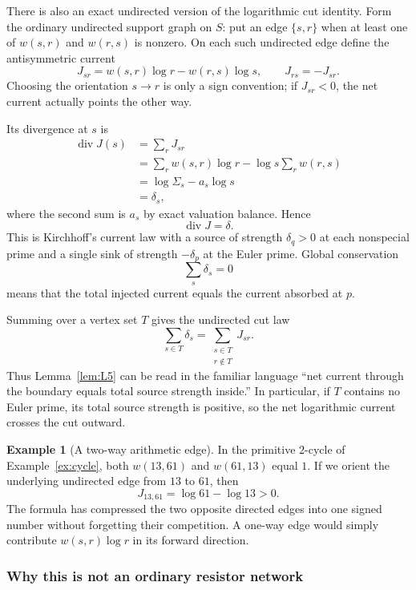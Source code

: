 \documentclass[11pt]{article}
\theoremstyle{definition}
\newtheorem{example}[theorem]{Example}
\theoremstyle{remark}
\begin{document}
There is also an exact undirected version of the logarithmic cut identity.
Form the ordinary undirected support graph on $S$: put an edge $\{s,r\}$ when
at least one of $w(s,r)$ and $w(r,s)$ is nonzero.  On each such undirected
edge define the antisymmetric current
\[
\boxed{
J_{sr}=w(s,r)\log r-w(r,s)\log s,
\qquad J_{rs}=-J_{sr}.
}
\]
Choosing the orientation $s\to r$ is only a sign convention; if $J_{sr}<0$,
the net current actually points the other way.

Its divergence at $s$ is
\[
\begin{aligned}
\operatorname{div}J(s)
 &=\sum_r J_{sr}\\
 &=\sum_r w(s,r)\log r
   -\log s\sum_r w(r,s)\\
 &=\log\Sigma_s-a_s\log s\\
 &=\delta_s,
\end{aligned}
\]
where the second sum is $a_s$ by exact valuation balance.  Hence
\[
\boxed{\operatorname{div}J=\delta.}
\]
This is Kirchhoff's current law with a source of strength $\delta_q>0$ at
each nonspecial prime and a single sink of strength $-\delta_p$ at the Euler
prime.  Global conservation
\[
\sum_s\delta_s=0
\]
means that the total injected current equals the current absorbed at $p$.

Summing over a vertex set $T$ gives the undirected cut law
\[
\boxed{
\sum_{s\in T}\delta_s
 =\sum_{\substack{s\in T\\ r\notin T}}J_{sr}.
}
\]
Thus Lemma~\ref{lem:L5} can be read in the familiar language ``net current
through the boundary equals total source strength inside.''  In particular,
if $T$ contains no Euler prime, its total source strength is positive, so the
net logarithmic current crosses the cut outward.

\begin{example}[A two-way arithmetic edge]
In the primitive $2$-cycle of Example~\ref{ex:cycle}, both
$w(13,61)$ and $w(61,13)$ equal $1$.  If we orient the underlying undirected
edge from $13$ to $61$, then
\[
J_{13,61}=\log61-\log13>0.
\]
The formula has compressed the two opposite directed edges into one signed
number without forgetting their competition.  A one-way edge would simply
contribute $w(s,r)\log r$ in its forward direction.
\end{example}

\subsubsection{Why this is not an ordinary resistor network}
\end{document}
